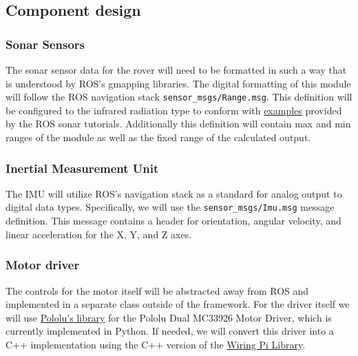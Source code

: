\documentclass[onecolumn, draftclsnofoot,10pt, compsoc]{IEEEtran}
\def\code#1{\texttt{#1}}
\begin{document}
\subsection{Component design}
\subsubsection{Sonar Sensors}
The sonar sensor data for the rover will need to be formatted in such a way that is understood by ROS's gmapping libraries. The digital formatting of this module will follow the ROS navigation stack \code{sensor\_msgs/Range.msg}. This definition will be configured to the infrared radiation type to conform with \href{http://wiki.ros.org/Robots/evarobot/Tutorials/indigo/Sonar}{examples} provided by the ROS sonar tutorials. Additionally this definition will contain max and min ranges of the module as well as the fixed range of the calculated output.
\subsubsection{Inertial Measurement Unit}
The IMU will utilize ROS's navigation stack as a standard for analog output to digital data types. Specifically, we will use the \code{sensor\_msgs/Imu.msg} message definition. This message contains a header for orientation, angular velocity, and linear acceleration for the X, Y, and Z axes.
\subsubsection{Motor driver}
The controls for the motor itself will be abstracted away from ROS and implemented in a separate class outside of the framework. For the driver itself we will use \href{https://github.com/pololu/dual-mc33926-motor-driver-rpi}{Pololu's library} for the Pololu Dual MC33926 Motor Driver, which is currently implemented in Python. If needed, we will convert this driver into a C++ implementation using the C++ version of the \href{http://wiringpi.com/}{Wiring Pi Library}.
\end{document}
